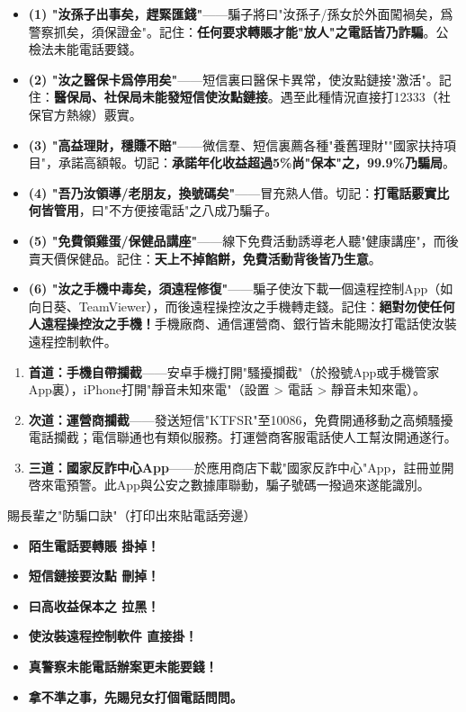 \begin{itemize}
  \item \textbf{(1) "汝孫子出事矣，趕緊匯錢"}——騙子將曰"汝孫子/孫女於外面闖禍矣，爲警察抓矣，須保證金"。記住：\textbf{任何要求轉賬才能"放人"之電話皆乃詐騙}。公檢法未能電話要錢。
  \item \textbf{(2) "汝之醫保卡爲停用矣"}——短信裏曰醫保卡異常，使汝點鏈接"激活"。記住：\textbf{醫保局、社保局未能發短信使汝點鏈接}。遇至此種情況直接打12333（社保官方熱線）覈實。
  \item \textbf{(3) "高益理財，穩賺不賠"}——微信羣、短信裏薦各種"養舊理財""國家扶持項目"，承諾高額報。切記：\textbf{承諾年化收益超過5\%尚"保本"之，99.9\%乃騙局}。
  \item \textbf{(4) "吾乃汝領導/老朋友，換號碼矣"}——冒充熟人借。切記：\textbf{打電話覈實比何皆管用}，曰"不方便接電話"之八成乃騙子。
  \item \textbf{(5) "免費領雞蛋/保健品講座"}——線下免費活動誘導老人聽"健康講座"，而後賣天價保健品。記住：\textbf{天上不掉餡餅，免費活動背後皆乃生意}。
  \item \textbf{(6) "汝之手機中毒矣，須遠程修復"}——騙子使汝下載一個遠程控制App（如向日葵、TeamViewer），而後遠程操控汝之手機轉走錢。記住：\textbf{絕對勿使任何人遠程操控汝之手機！}手機廠商、通信運營商、銀行皆未能賜汝打電話使汝裝遠程控制軟件。
\end{itemize}


\begin{enumerate}
  \item \textbf{首道：手機自帶攔截}——安卓手機打開"騷擾攔截"（於撥號App或手機管家App裏），iPhone打開"靜音未知來電"（設置 > 電話 > 靜音未知來電）。
  \item \textbf{次道：運營商攔截}——發送短信"KTFSR"至10086，免費開通移動之高頻騷擾電話攔截；電信聯通也有類似服務。打運營商客服電話使人工幫汝開通遂行。
  \item \textbf{三道：國家反詐中心App}——於應用商店下載"國家反詐中心"App，註冊並開啓來電預警。此App與公安之數據庫聯動，騙子號碼一撥過來遂能識別。
\end{enumerate}

\begin{tcbwarn}{賜長輩之"防騙口訣"（打印出來貼電話旁邊）}
\begin{itemize}
  \item \textbf{陌生電話要轉賬 掛掉！}
  \item \textbf{短信鏈接要汝點 刪掉！}
  \item \textbf{曰高收益保本之 拉黑！}
  \item \textbf{使汝裝遠程控制軟件 直接掛！}
  \item \textbf{真警察未能電話辦案更未能要錢！}
  \item \textbf{拿不準之事，先賜兒女打個電話問問。}
\end{itemize}

\end{tcbwarn}

